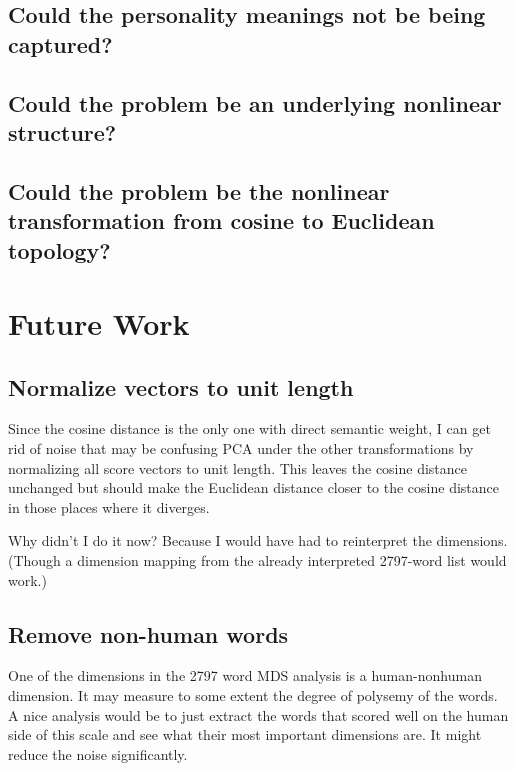 \documentclass[eric_thesis.tex]{subfiles}
\begin{document}
\section{Could the personality meanings not be being captured?}


\section{Could the problem be an underlying nonlinear structure?}

\section{Could the problem be the nonlinear transformation from cosine to Euclidean topology?}

\chapter{Future Work}

\section{Normalize vectors to unit length}


Since the cosine distance is the only one with direct semantic weight, I can 
get rid of noise that may be confusing PCA under the other transformations by
normalizing all score vectors to unit length. This leaves the cosine distance
unchanged but should make the Euclidean distance closer to the cosine distance
in those places where it diverges.

Why didn't I do it now? Because I would have had to reinterpret the dimensions.
(Though a dimension mapping from the already interpreted 2797-word list would
work.)

\section{Remove non-human words}


One of the dimensions in the 2797 word MDS analysis is a human-nonhuman 
dimension. It may measure to some extent the degree of polysemy of the words. A 
nice analysis would be to just extract the words that scored well on the human 
side of this scale and see what their most important dimensions are. It might 
reduce the noise significantly.
\end{document}
